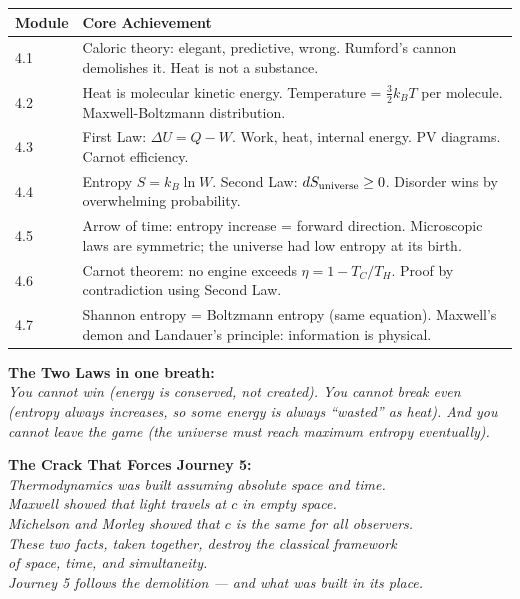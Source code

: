 \documentclass[12pt, a4paper, twoside]{book}
\begin{document}
\begin{tcolorbox}[enhanced,colback=deep!4,colframe=deep,
  title={\bfseries\color{white} Journey 4 at a Glance: Heat, Disorder, and the Arrow of Time},
  attach boxed title to top left={yshift=-2mm,xshift=4mm},
  boxed title style={colback=deep}]

\begin{center}
\begin{tabular}{@{}p{1.8cm}p{10.5cm}@{}}
\toprule
\textbf{Module} & \textbf{Core Achievement} \\
\midrule
4.1 & Caloric theory: elegant, predictive, wrong. Rumford's cannon demolishes it. Heat is not a substance. \\
4.2 & Heat is molecular kinetic energy. Temperature = $\frac{3}{2}k_BT$ per molecule. Maxwell-Boltzmann distribution. \\
4.3 & First Law: $\Delta U = Q - W$. Work, heat, internal energy. PV diagrams. Carnot efficiency. \\
4.4 & Entropy $S = k_B\ln W$. Second Law: $dS_{\rm universe}\geq 0$. Disorder wins by overwhelming probability. \\
4.5 & Arrow of time: entropy increase = forward direction. Microscopic laws are symmetric; the universe had low entropy at its birth. \\
4.6 & Carnot theorem: no engine exceeds $\eta = 1-T_C/T_H$. Proof by contradiction using Second Law. \\
4.7 & Shannon entropy = Boltzmann entropy (same equation). Maxwell's demon and Landauer's principle: information is physical. \\
\bottomrule
\end{tabular}
\end{center}

\vspace{6pt}
\textbf{The Two Laws in one breath:}\\[4pt]
\textit{You cannot win (energy is conserved, not created). You cannot break even (entropy always increases, so some energy is always ``wasted'' as heat). And you cannot leave the game (the universe must reach maximum entropy eventually).}
\end{tcolorbox}

\vspace{0.5cm}
\begin{center}
{\large\textcolor{deep}{\textbf{The Crack That Forces Journey 5:}}}\\[8pt]
{\itshape\textcolor{midblue}{%
Thermodynamics was built assuming absolute space and time.\\[3pt]
Maxwell showed that light travels at $c$ in empty space.\\[3pt]
Michelson and Morley showed that $c$ is the same for all observers.\\[3pt]
These two facts, taken together, destroy the classical framework\\[3pt]
of space, time, and simultaneity.\\[6pt]
Journey 5 follows the demolition --- and what was built in its place.
}}
\end{center}
\end{document}
